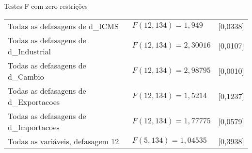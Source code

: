 \documentclass[11pt]{article}
\begin{document}
\begin{center}
Testes-F com zero restrições\\[1em]
\begin{tabular}{lll}
Todas as defasagens de d\_ICMS & $F(12, 134) = 1,949$ & [0,0338]\\
Todas as defasagens de d\_Industrial & $F(12, 134) = 2,30016$ & [0,0107]\\
Todas as defasagens de d\_Cambio & $F(12, 134) = 2,98795$ & [0,0010]\\
Todas as defasagens de d\_Exportacoes & $F(12, 134) = 1,5214$ & [0,1237]\\
Todas as defasagens de d\_Importacoes & $F(12, 134) = 1,77775$ & [0,0579]\\
Todas as variáveis, defasagem 12 & $F(5, 134) = 1,04535$ & [0,3938]\\
\end{tabular}
\end{center}

\clearpage
\end{document}
